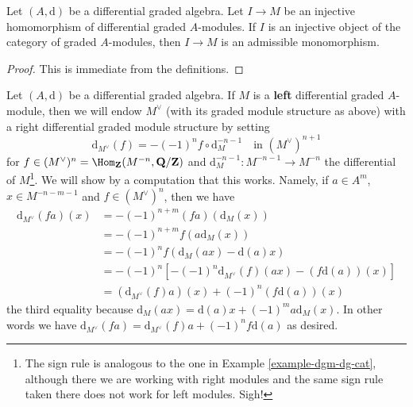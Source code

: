 \begin{lemma}
\label{lemma-source-graded-injective}
Let $(A, \text{d})$ be a differential graded algebra.
Let $I \to M$ be an injective homomorphism of differential graded
$A$-modules. If $I$ is an injective object of the category
of graded $A$-modules, then $I \to M$ is an admissible monomorphism.
\end{lemma}

\begin{proof}
This is immediate from the definitions.
\end{proof}

\noindent
Let $(A, \text{d})$ be a differential graded algebra. If $M$ is a
{\bf left} differential graded $A$-module, then we will endow $M^\vee$
(with its graded module structure as above) with a right differential
graded module structure by setting
$$
\text{d}_{M^\vee}(f) = - (-1)^n f \circ \text{d}_M^{-n - 1}
\quad\text{in }(M^\vee)^{n + 1}
$$
for $f \in (M^\vee)^n = \Hom_\mathbf{Z}(M^{-n}, \mathbf{Q}/\mathbf{Z})$
and $\text{d}_M^{-n - 1} : M^{-n - 1} \to M^{-n}$ the differential
of $M$\footnote{The sign rule is analogous to the one in
Example \ref{example-dgm-dg-cat}, although there we are working with
right modules and the same sign rule taken there does not work for
left modules. Sigh!}.
We will show by a computation that this works.
Namely, if $a \in A^m$, $x \in M^{-n - m - 1}$ and $f \in (M^\vee)^n$,
then we have
\begin{align*}
\text{d}_{M^\vee}(f a)(x) & =
- (-1)^{n + m} (f a)(\text{d}_M(x)) \\
& =
- (-1)^{n + m} f(a\text{d}_M(x)) \\
& =
-(-1)^n f(\text{d}_M(ax) - \text{d}(a)x) \\
& =
-(-1)^n[-(-1)^n \text{d}_{M^\vee}(f)(ax) - (f\text{d}(a))(x)] \\
& =
(\text{d}_{M^\vee}(f)a)(x) + (-1)^n (f\text{d}(a))(x)
\end{align*}
the third equality because
$\text{d}_M(ax) = \text{d}(a)x + (-1)^m a\text{d}_M(x)$.
In other words we have
$\text{d}_{M^\vee}(fa) = \text{d}_{M^\vee}(f)a + (-1)^n f \text{d}(a)$
as desired.

